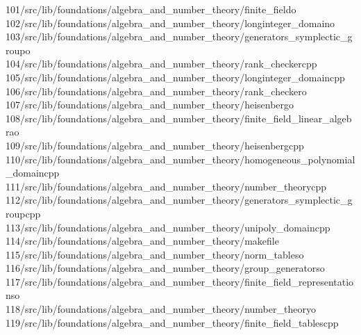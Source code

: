 \begin{tabbing}
101\>/src/lib/foundations/algebra\_and\_number\_theory/finite\_fieldo\\[0pt]
102\>/src/lib/foundations/algebra\_and\_number\_theory/longinteger\_domaino\\[0pt]
103\>/src/lib/foundations/algebra\_and\_number\_theory/generators\_symplectic\_groupo\\[0pt]
104\>/src/lib/foundations/algebra\_and\_number\_theory/rank\_checkercpp\\[0pt]
105\>/src/lib/foundations/algebra\_and\_number\_theory/longinteger\_domaincpp\\[0pt]
106\>/src/lib/foundations/algebra\_and\_number\_theory/rank\_checkero\\[0pt]
107\>/src/lib/foundations/algebra\_and\_number\_theory/heisenbergo\\[0pt]
108\>/src/lib/foundations/algebra\_and\_number\_theory/finite\_field\_linear\_algebrao\\[0pt]
109\>/src/lib/foundations/algebra\_and\_number\_theory/heisenbergcpp\\[0pt]
110\>/src/lib/foundations/algebra\_and\_number\_theory/homogeneous\_polynomial\_domaincpp\\[0pt]
111\>/src/lib/foundations/algebra\_and\_number\_theory/number\_theorycpp\\[0pt]
112\>/src/lib/foundations/algebra\_and\_number\_theory/generators\_symplectic\_groupcpp\\[0pt]
113\>/src/lib/foundations/algebra\_and\_number\_theory/unipoly\_domaincpp\\[0pt]
114\>/src/lib/foundations/algebra\_and\_number\_theory/makefile\\[0pt]
115\>/src/lib/foundations/algebra\_and\_number\_theory/norm\_tableso\\[0pt]
116\>/src/lib/foundations/algebra\_and\_number\_theory/group\_generatorso\\[0pt]
117\>/src/lib/foundations/algebra\_and\_number\_theory/finite\_field\_representationso\\[0pt]
118\>/src/lib/foundations/algebra\_and\_number\_theory/number\_theoryo\\[0pt]
119\>/src/lib/foundations/algebra\_and\_number\_theory/finite\_field\_tablescpp\\[0pt]

\end{tabbing}
